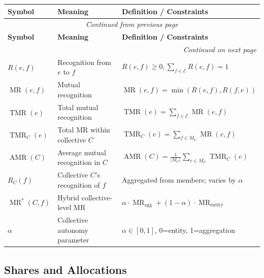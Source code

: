 \documentclass[11pt,a4paper]{article}
\theoremstyle{definition}
\theoremstyle{remark}
\newcommand{\E}{\mathcal{E}}
\DeclareMathOperator{\TMR}{TMR}
\DeclareMathOperator{\MR}{MR}
\DeclareMathOperator{\AMR}{AMR}
\begin{document}
\begin{longtable}{lll}
\toprule
\textbf{Symbol} & \textbf{Meaning} & \textbf{Definition / Constraints} \\
\midrule
\endfirsthead
\multicolumn{3}{c}{\textit{Continued from previous page}} \\
\toprule
\textbf{Symbol} & \textbf{Meaning} & \textbf{Definition / Constraints} \\
\midrule
\endhead
\midrule
\multicolumn{3}{r}{\textit{Continued on next page}} \\
\endfoot
\bottomrule
\endlastfoot
$R(e,f)$ & Recognition from $e$ to $f$ & $R(e,f) \ge 0, \sum_{f \in \E} R(e,f) = 1$ \\
$\MR(e,f)$ & Mutual recognition & $\MR(e,f) = \min(R(e,f), R(f,e))$ \\
$\TMR(e)$ & Total mutual recognition & $\TMR(e) = \sum_{f \in \E} \MR(e,f)$ \\
$\TMR_C(e)$ & Total MR within collective $C$ & $\TMR_C(e) = \sum_{f \in M_C} \MR(e,f)$ \\
$\AMR(C)$ & Average mutual recognition in $C$ & $\AMR(C) = \frac{1}{|M_C|} \sum_{e \in M_C} \TMR_C(e)$ \\
$R_C(f)$ & Collective $C$'s recognition of $f$ & Aggregated from members; varies by $\alpha$ \\
$\MR^*(C,f)$ & Hybrid collective-level MR & $\alpha \cdot \MR_{\text{agg}} + (1-\alpha) \cdot \MR_{\text{entity}}$ \\
$\alpha$ & Collective autonomy parameter & $\alpha \in [0,1]$, 0=entity, 1=aggregation \\
\end{longtable}

\subsection{Shares and Allocations}
\end{document}
